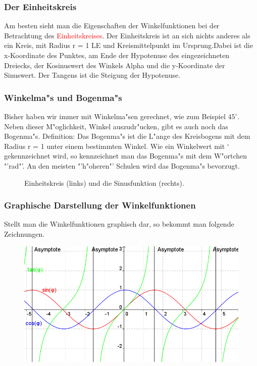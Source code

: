\subsubsection{Der Einheitskreis}
Am besten sieht man die Eigenschaften der Winkelfunktionen bei der Betrachtung des \textcolor{red}{Einheitskreises}. Der Einheitskreis ist an sich nichts anderes als ein Kreis, mit Radius r = 1 LE und Kreismittelpunkt im Ursprung.Dabei ist die x-Koordinate des Punktes, am Ende der Hypotenuse des eingezeichneten Dreiecks, der Kosinuswert des Winkels Alpha und die y-Koordinate der Sinuswert. Der Tangens ist die Steigung der Hypotenuse.

\subsubsection{Winkelma"s und Bogenma"s}
Bisher haben wir immer mit Winkelma"sen gerechnet, wie zum Beispiel $45^\circ$. Neben dieser M"oglichkeit, Winkel auszudr"ucken, gibt es auch noch das Bogenma"s.
Definition: Das Bogenma"s ist die L"ange des Kreisbogens mit dem Radius r = 1 unter einem bestimmten Winkel.
Wie ein Winkelwert mit $^\circ$ gekennzeichnet wird, so kennzeichnet man das Bogenma"s mit dem W"ortchen "'rad"'.
An den meisten "'h"oheren"' Schulen wird das Bogenma"s bevorzugt.

\begin{figure}[h!]

\caption{Einheitskreis (links) und die Sinusfunktion (rechts).}
\end{figure}

\subsubsection{Graphische Darstellung der Winkelfunktionen}
Stellt man die Winkelfunktionen graphisch dar, so bekommt man folgende Zeichnungen.
\begin{center}
\begin{figure}[h!]
\includegraphics[width = 13 cm, height = 5 cm]{pictures/Winkelfunktionen}
\end{figure}
\end{center}

